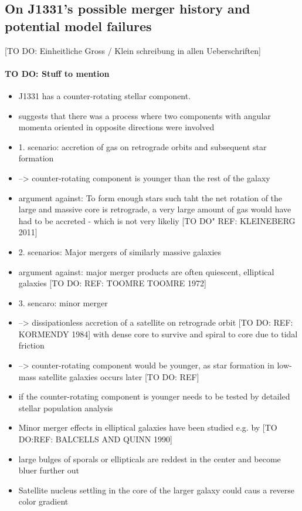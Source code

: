 \subsection{On J1331's possible merger history and potential model failures}

[TO DO: Einheitliche Gross / Klein schreibung in allen Ueberschriften]

\paragraph{TO DO: Stuff to mention}
\begin{itemize}
\item J1331 has a counter-rotating stellar component.
\item suggests that there was a process where two components with angular momenta oriented in opposite directions were involved
\item 1. scenario: accretion of gas on retrograde orbits and subsequent star formation
\item --> counter-rotating component is younger than the rest of the galaxy
\item argument against: To form enough stars such taht the net rotation of the large and massive core is retrograde, a very large amount of gas would have had to be accreted - which is not very likeliy [TO DO" REF: KLEINEBERG 2011] 
\item 2. scenarios: Major mergers of similarly massive galaxies
\item argument against: major merger products are often quiescent, elliptical galaxies [TO DO: REF: TOOMRE TOOMRE 1972]
\item 3. sencaro: minor merger
\item --> dissipationless accretion of a satellite on retrograde orbit [TO DO: REF: KORMENDY 1984] with dense core to survive and spiral to core due to tidal friction
\item --> counter-rotating component would be younger, as star formation in low-mass satellite galaxies occurs later [TO DO: REF]
\item if the counter-rotating component is younger needs to be tested by detailed stellar population analysis
\item Minor merger effects in elliptical galaxies have been studied e.g. by [TO DO:REF: BALCELLS AND QUINN 1990]
\item large bulges of sporals or ellipticals are reddest in the center and become bluer further out
\item Satellite nucleus settling in the core of the larger galaxy could caus a reverse color gradient

\end{itemize}
